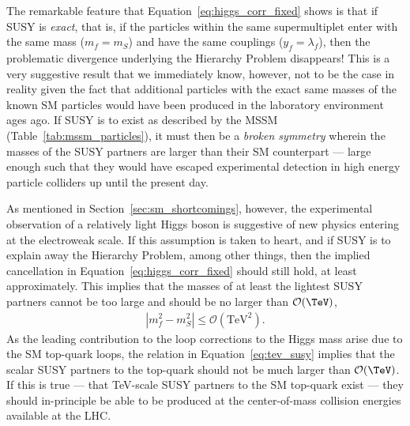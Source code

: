 The remarkable feature that Equation~\ref{eq:higgs_corr_fixed} shows is that if SUSY is \textit{exact}, that is, if the particles within the same supermultiplet 
enter with the same mass ($m_f = m_S$) and have the same couplings ($y_f = \lambda_f$), then the problematic divergence underlying the Hierarchy Problem
disappears!
This is a very suggestive result that we immediately know, however, not to be the case
in reality given the fact that
additional particles with the exact same masses of the known SM particles would have been produced in the laboratory
environment ages ago.
If SUSY is to exist as described by the MSSM (Table~\ref{tab:mssm_particles}), it must then
be a \textit{broken symmetry} wherein the masses of the SUSY partners are larger than
their SM counterpart --- large enough such that they would have escaped experimental detection
in high energy particle colliders up until the present day.

As mentioned in Section~\ref{sec:sm_shortcomings}, however, the experimental observation of a relatively
light Higgs boson is suggestive of new physics entering at the electroweak scale.
If this assumption is taken to heart, and if SUSY is to explain away the Hierarchy Problem, among other things,
then the implied cancellation in Equation~\ref{eq:higgs_corr_fixed} should still hold, at least approximately.
This implies that the masses of at least the lightest SUSY partners cannot be too large
and should be no larger than $\mathcal{O}(\TeV)$,
\begin{align}
    |m_f^2 - m_S^2| \le \mathcal{O}(\text{TeV}^2).
    \label{eq:tev_susy}
\end{align}
As the leading contribution to the loop corrections to the Higgs mass arise due to the SM top-quark loops,
the relation in Equation~\ref{eq:tev_susy} implies that the scalar SUSY partners to the top-quark should
not be much larger than $\mathcal{O}(\TeV)$.
If this is true --- that TeV-scale SUSY partners to the SM top-quark exist --- they should in-principle
be able to be produced at the center-of-mass collision energies available at the LHC.

